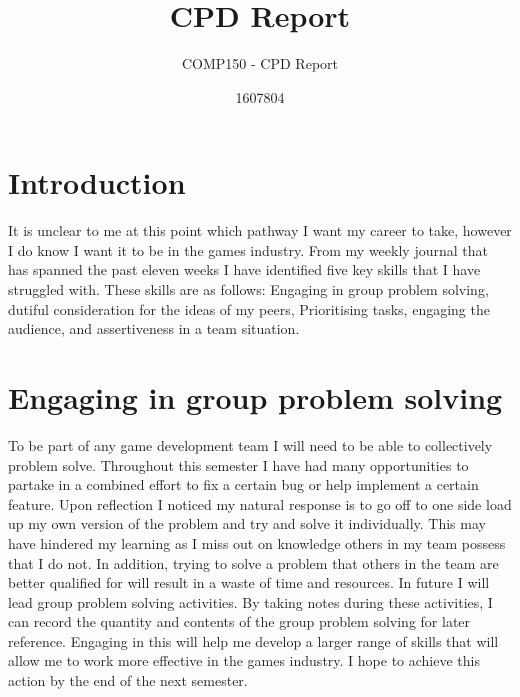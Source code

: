 \documentclass{scrartcl}
\title{CPD Report}
\subtitle{COMP150 - CPD Report}
\author{1607804}
\begin{document}
\maketitle

\section{Introduction}
It is unclear to me at this point which pathway I want my career to take, however I do know I want it to be in the games industry.  From my weekly journal that has spanned the past eleven weeks I have identified five key skills that I have struggled with. These skills are as follows: Engaging in group problem solving, dutiful consideration for the ideas of my peers, Prioritising tasks, engaging the audience, and assertiveness in a team situation.


\section{Engaging in group problem solving}
To be part of any game development team I will need to be able to collectively problem solve. Throughout this semester I have had many opportunities to partake in a combined effort to fix a certain bug or help implement a certain feature. Upon reflection I noticed my natural response is to go off to one side load up my own version of the problem and try and solve it individually. This may have hindered my learning as I miss out on knowledge others in my team possess that I do not. In addition, trying to solve a problem that others in the team are better qualified for will result in a waste of time and resources. In future I will lead group problem solving activities. By taking notes during these activities, I can record the quantity and contents of the group problem solving for later reference. Engaging in this will help me develop a larger range of skills that will allow me to work more effective in the games industry. I hope to achieve this action by the end of the next semester.
\end{document}
